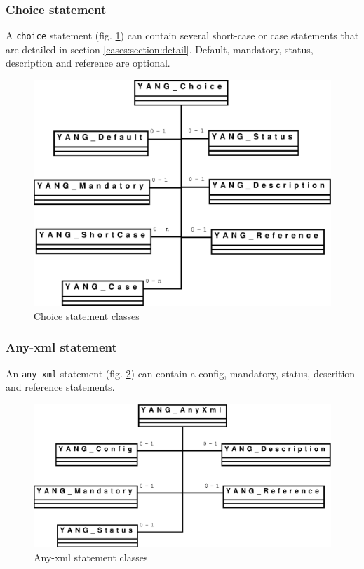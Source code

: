 \documentclass[a4paper]{article}
\begin{document}
\subsubsection{Choice statement}
\label{cases:section:global}
A  {\tt  choice} statement  (fig.  \ref{choice})  can contain  several
short-case   or  case   statements  that   are  detailed   in  section
\ref{cases:section:detail}.   Default, mandatory,  status, description
and reference are optional.
\begin{figure}[htbp]
\begin{center}
\includegraphics[scale = .3]{choice.eps}
\end{center}
\caption{Choice statement classes}
\label{choice}
\end{figure}

\subsubsection{Any-xml statement}

An {\tt any-xml} statement (fig.  \ref{anyxml}) can contain a config,
mandatory, status, descrition and reference statements.
\begin{figure}[htbp]
\begin{center}
\includegraphics[scale = .3]{anyxml.eps}
\end{center}
\caption{Any-xml statement classes}
\label{anyxml}
\end{figure}
\end{document}
